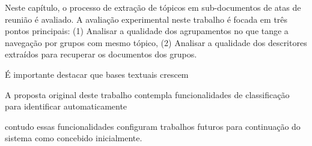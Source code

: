Neste capítulo, o processo de extração de tópicos em sub-documentos de atas de reunião é avaliado. A avaliação experimental neste trabalho é focada em três pontos principais: 
(1) Analisar a qualidade dos agrupamentos no que tange a navegação por grupos com mesmo tópico, 
(2) Analisar a qualidade dos descritores extraídos para recuperar os documentos dos grupos.





É importante destacar que bases textuais crescem 



A proposta original deste trabalho contempla funcionalidades de classificação para identificar automaticamente 

contudo essas funcionalidades configuram trabalhos futuros para continuação do sistema como concebido inicialmente.




